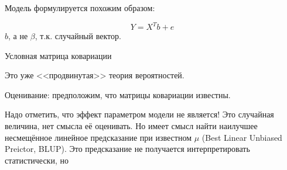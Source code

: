 \documentclass[main.tex]{subfiles}
\begin{document}
Модель формулируется похожим образом:

\[ Y = X^T b + e \]
$ b $,  а не $ \beta $, т.к. случайный вектор.

Условная матрица ковариации 

\begin{leftbar}
	Это уже <<продвинутая>> теория вероятностей.
\end{leftbar}

Оценивание:
предположим, что матрицы ковариации известны.

Надо отметить, что эффект параметром модели не является!
Это случайная величина, нет смысла её оценивать.
Но имеет смысл найти наилучшее несмещённое линейное предсказание при известном $ \mu $ (Best Linear Unbiased Preictor, BLUP).
Это предсказание не получается интерпретировать статистически, но 

\end{document}
